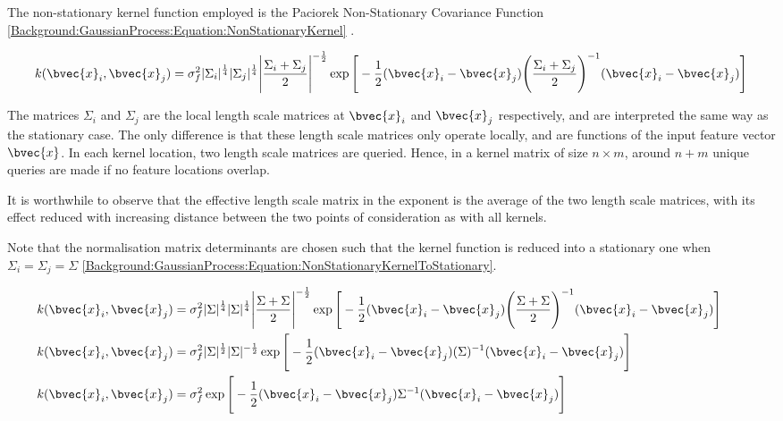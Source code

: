 			The non-stationary kernel function employed is the Paciorek Non-Stationary Covariance Function \eqref{Background:GaussianProcess:Equation:NonStationaryKernel} \cite{AdaptiveNonStationaryKernel}.
			
			\begin{equation}
				k(\bvec{x}_{i}, \bvec{x}_{j}) = \sigma_{f}^{2} |\Sigma_{i}|^{\frac{1}{4}} |\Sigma_{j}|^{\frac{1}{4}} \Bigg|\frac{\Sigma_{i} + \Sigma_{j}}{2}\Bigg|^{-\frac{1}{2}} \exp\Bigg[ -\frac{1}{2} (\bvec{x}_{i} - \bvec{x}_{j}) \Bigg(\frac{\Sigma_{i} + \Sigma_{j}}{2}\Bigg)^{-1} (\bvec{x}_{i} - \bvec{x}_{j}) \Bigg]
			\label{Background:GaussianProcess:Equation:NonStationaryKernel}
			\end{equation}			
			
			The matrices $\Sigma_{i}$ and $\Sigma_{j}$ are the local length scale matrices at $\bvec{x}_{i}$ and $\bvec{x}_{j}$ respectively, and are interpreted the same way as the stationary case. The only difference is that these length scale matrices only operate locally, and are functions of the input feature vector $\bvec{x}$. In each kernel location, two length scale matrices are queried. Hence, in a kernel matrix of size $n \times m$, around $n + m$ unique queries are made if no feature locations overlap.
			
			It is worthwhile to observe that the effective length scale matrix in the exponent is the average of the two length scale matrices, with its effect reduced with increasing distance between the two points of consideration as with all kernels.
			
			Note that the normalisation matrix determinants are chosen such that the kernel function is reduced into a stationary one when $\Sigma_{i} = \Sigma_{j} = \Sigma$ \eqref{Background:GaussianProcess:Equation:NonStationaryKernelToStationary}. 
			
			\begin{equation}
				\left.
					\begin{aligned}
						k(\bvec{x}_{i}, \bvec{x}_{j}) &= \sigma_{f}^{2} |\Sigma|^{\frac{1}{4}} |\Sigma|^{\frac{1}{4}} \Bigg|\frac{\Sigma + \Sigma}{2}\Bigg|^{-\frac{1}{2}} \exp\Bigg[ -\frac{1}{2} (\bvec{x}_{i} - \bvec{x}_{j}) \Bigg(\frac{\Sigma + \Sigma}{2}\Bigg)^{-1} (\bvec{x}_{i} - \bvec{x}_{j}) \Bigg] \\
						k(\bvec{x}_{i}, \bvec{x}_{j}) &= \sigma_{f}^{2} |\Sigma|^{\frac{1}{2}} |\Sigma|^{-\frac{1}{2}} \exp\Bigg[ -\frac{1}{2} (\bvec{x}_{i} - \bvec{x}_{j}) (\Sigma)^{-1} (\bvec{x}_{i} - \bvec{x}_{j}) \Bigg] \\
						k(\bvec{x}_{i}, \bvec{x}_{j}) &= \sigma_{f}^{2} \exp\Bigg[ -\frac{1}{2} (\bvec{x}_{i} - \bvec{x}_{j}) \Sigma^{-1} (\bvec{x}_{i} - \bvec{x}_{j}) \Bigg]
					\end{aligned}
				\qquad \right.
			\label{Background:GaussianProcess:Equation:NonStationaryKernelToStationary}
			\end{equation}		
			
